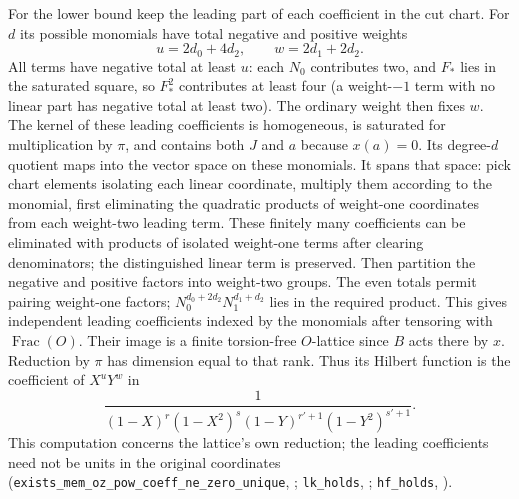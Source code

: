 For the lower bound keep the leading part of each coefficient in the
cut chart. For $d$ its possible monomials have total negative and
positive weights
\[
                    u=2d_0+4d_2,\qquad w=2d_1+2d_2 .
\]
All terms have negative total at least $u$: each $N_0$ contributes
two, and $F_*$ lies in the saturated square, so $F_*^2$ contributes
at least four (a weight-$-1$ term with no linear part has negative
total at least two). The ordinary weight then fixes $w$. The kernel
of these leading coefficients is homogeneous, is saturated for
multiplication by $\pi$, and contains both $J$ and $a$ because
$x(a)=0$. Its degree-$d$ quotient maps into the vector space on these
monomials. It spans that space: pick chart elements isolating each
linear coordinate, multiply them according to the monomial, first eliminating the quadratic products of weight-one
coordinates from each weight-two leading term. These finitely many
coefficients can be eliminated with products of isolated weight-one
terms after clearing denominators; the distinguished linear term
is preserved. Then partition the negative and positive factors into weight-two groups.
The even totals permit pairing weight-one factors; $N_0^{d_0+2d_2}
N_1^{d_1+d_2}$ lies in the required product. This gives independent
leading coefficients indexed by the monomials after tensoring with
$\operatorname{Frac}(O)$. Their image is a finite torsion-free
$O$-lattice since $B$ acts there by $x$. Reduction by $\pi$ has
dimension equal to that rank. Thus its Hilbert function is the
coefficient of $X^uY^w$ in
\[
  \frac{1}{(1-X)^r(1-X^2)^s(1-Y)^{r'+1}(1-Y^2)^{s'+1}}.
\]
This computation concerns the lattice's own reduction; the leading
coefficients need not be units in the original coordinates
(\nolinkurl{exists_mem_oz_pow_coeff_ne_zero_unique},
;
\nolinkurl{lk_holds}, ;
\nolinkurl{hf_holds}, ).

